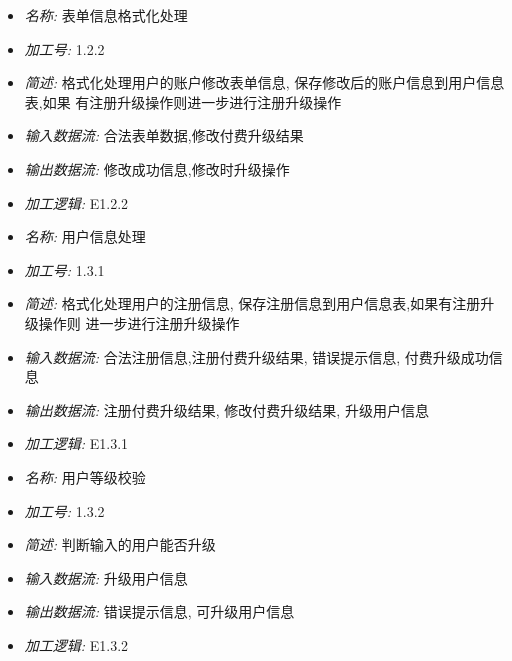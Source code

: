 \documentclass{article}
\begin{document}
\begin{CJK*}{UTF8}{gbsn}
\vspace{-1mm}


\begin{itemize}
\item \textit{名称: } 表单信息格式化处理
\item \textit{加工号: } 1.2.2
\item \textit{简述: } 格式化处理用户的账户修改表单信息, 保存修改后的账户信息到用户信息表,如果 有注册升级操作则进一步进行注册升级操作
\item \textit{输入数据流: } 合法表单数据,修改付费升级结果
\item \textit{输出数据流: } 修改成功信息,修改时升级操作
\item \textit{加工逻辑: } E1.2.2

\end{itemize}


\vspace{-1mm}


\begin{itemize}
\item \textit{名称: } 用户信息处理
\item \textit{加工号: } 1.3.1
\item \textit{简述: } 格式化处理用户的注册信息, 保存注册信息到用户信息表,如果有注册升级操作则 进一步进行注册升级操作
\item \textit{输入数据流: } 合法注册信息,注册付费升级结果, 错误提示信息, 付费升级成功信息 
\item \textit{输出数据流: } 注册付费升级结果, 修改付费升级结果, 升级用户信息
\item \textit{加工逻辑: } E1.3.1

\end{itemize}


\vspace{-1mm}


\begin{itemize}
\item \textit{名称: } 用户等级校验
\item \textit{加工号: } 1.3.2
\item \textit{简述: } 判断输入的用户能否升级 
\item \textit{输入数据流: } 升级用户信息 
\item \textit{输出数据流: } 错误提示信息, 可升级用户信息
\item \textit{加工逻辑: } E1.3.2

\end{itemize}


\vspace{-1mm}



\end{CJK*}
\end{document}
